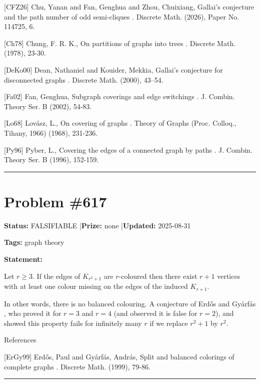 \documentclass{article}
\begin{document}
[CFZ26] Chu, Yanan and Fan, Genghua and Zhou, Chuixiang, Gallai's conjecture and the path number of odd semi-cliques . Discrete Math. (2026), Paper No. 114725, 6.

[Ch78] Chung, F. R. K., On partitions of graphs into trees . Discrete Math. (1978), 23-30.

[DeKo00] Dean, Nathaniel and Kouider, Mekkia, Gallai's conjecture for disconnected graphs . Discrete Math. (2000), 43--54.

[Fa02] Fan, Genghua, Subgraph coverings and edge switchings . J. Combin. Theory Ser. B (2002), 54-83.

[Lo68] Lov\'{a}sz, L., On covering of graphs . Theory of Graphs (Proc. Colloq., Tihany, 1966) (1968), 231-236.

[Py96] Pyber, L., Covering the edges of a connected graph by paths . J. Combin. Theory Ser. B (1996), 152-159.

\noindent\rule{\linewidth}{0.4pt}


\section{Problem \#617}
\label{prob:617}

\noindent\textbf{Status:} FALSIFIABLE \quad|\quad \textbf{Prize:} none \quad|\quad \textbf{Updated:} 2025-08-31

\noindent\textbf{Tags:} graph theory

\medskip

\noindent\textbf{Statement:}

Let $r\geq 3$. If the edges of $K_{r^2+1}$ are $r$-coloured then there exist $r+1$ vertices with at least one colour missing on the edges of the induced $K_{r+1}$.




In other words, there is no balanced colouring. A conjecture of Erd\H{o}s and Gy\'{a}rf\'{a}s \cite{ErGy99}, who proved it for $r=3$ and $r=4$ (and observed it is false for $r=2$), and showed this property fails for infinitely many $r$ if we replace $r^2+1$ by $r^2$.




References

[ErGy99] Erd\H{o}s, Paul and Gy\'{a}rf\'{a}s, Andr\'{a}s, Split and balanced colorings of complete graphs . Discrete Math. (1999), 79-86.

\noindent\rule{\linewidth}{0.4pt}


\end{document}
